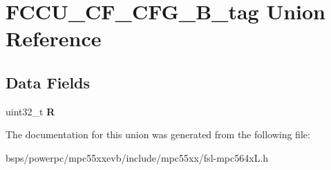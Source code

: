 \hypertarget{unionFCCU__CF__CFG__32B__tag}{}\section{F\+C\+C\+U\+\_\+\+C\+F\+\_\+\+C\+F\+G\+\_\+B\+\_\+tag Union Reference}
\label{unionFCCU__CF__CFG__32B__tag}
\subsection*{Data Fields}
\begin{DoxyCompactItemize}
\item 
\mbox{\label{unionFCCU__CF__CFG__32B__tag_a9519b07c9cb96a31373f02bba3e639f0}} 
uint32\+\_\+t {\bfseries R}
\end{DoxyCompactItemize}


The documentation for this union was generated from the following file\+:\begin{DoxyCompactItemize}
\item 
bsps/powerpc/mpc55xxevb/include/mpc55xx/fsl-\/mpc564x\+L.\+h\end{DoxyCompactItemize}
